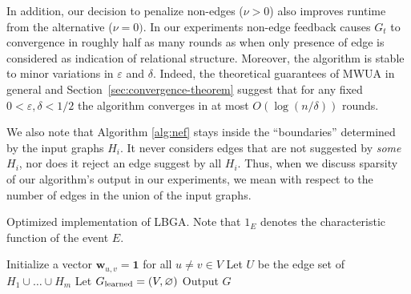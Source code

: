 \documentclass{IEEEtran}
\begin{document}
In addition, our decision to penalize non-edges ($\nu > 0$) also improves
runtime from the alternative ($\nu = 0)$. In our experiments non-edge feedback
causes $G_t$ to convergence in roughly half as many rounds as when only
presence of edge is considered as indication of relational structure. Moreover,
the algorithm is stable to minor variations in $\varepsilon$ and $\delta$.
Indeed, the theoretical guarantees of MWUA in general and
Section~\ref{sec:convergence-theorem} suggest that for any fixed $0 < \varepsilon,
\delta < 1/2$ the algorithm converges in at most $O(\log(n/\delta))$ rounds.

We also note that Algorithm \ref{alg:nef} stays inside the ``boundaries''
determined by the input graphs $H_i$.  It never considers edges that are not
suggested by \emph{some} $H_i$, nor does it reject an edge suggest by all
$H_i$. Thus, when we discuss sparsity of our algorithm's output in our
experiments, we mean with respect to the number of edges in the union of the
input graphs.

\begin{algorithm}[tbh]
\caption{Optimized implementation of LBGA. Note that $1_E$ denotes the
characteristic function of the event $E$.}
\label{alg:nef}
   \DontPrintSemicolon
   \SetAlgoLined
   {\footnotesize
   Initialize a vector $\mathbf{w}_{u,v} = \mathbf{1}$ for all $u \neq v \in V$\;
   Let $U$ be the edge set of $H_1 \cup \dots \cup H_m$\;
   Let $G_\textup{learned} = (V, \varnothing)$ \;
   Output $G$\;
}
\end{algorithm}
\end{document}
